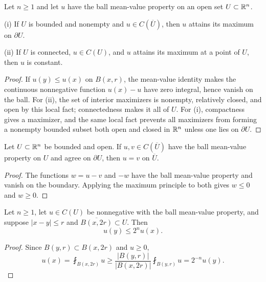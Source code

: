 \begin{theorem}
\label{thm:strong-maximum-principle-mvp}





Let $n\ge1$ and let $u$ have the ball mean-value property on an open set
$U\subset\mathbb{R}^n$.

(i) If $U$ is bounded and nonempty and $u\in C(\overline U)$, then $u$ attains
its maximum on $\partial U$.

(ii) If $U$ is connected, $u\in C(U)$, and $u$ attains its maximum at a point
of $U$, then $u$ is constant.
\end{theorem}
\begin{proof}

\sketch If $u(y)\le u(x)$ on $B(x,r)$, the mean-value identity makes the
continuous nonnegative function $u(x)-u$ have zero integral, hence vanish on
the ball. For (ii), the set of interior maximizers is nonempty, relatively
closed, and open by this local fact; connectedness makes it all of $U$. For
(i), compactness gives a maximizer, and the same local fact prevents all
maximizers from forming a nonempty bounded subset both open and closed in
$\mathbb{R}^n$ unless one lies on $\partial U$.
\end{proof}

\begin{theorem}
\label{thm:uniqueness-dirichlet-mvp}




Let $U\subset\mathbb{R}^n$ be bounded and open. If $u,v\in C(\overline U)$ have the
ball mean-value property on $U$ and agree on $\partial U$, then
$u=v$ on $\overline U$.
\end{theorem}
\begin{proof}

\sketch The functions $w=u-v$ and $-w$ have the ball mean-value property and
vanish on the boundary. Applying the maximum principle to both gives
$w\le0$ and $w\ge0$.
\end{proof}

\begin{theorem}
\label{thm:harnack-local-mvp}




Let $n\ge1$, let $u\in C(U)$ be nonnegative with the ball mean-value property,
and suppose $|x-y|\le r$ and $\overline{B(x,2r)}\subset U$. Then
$$u(y)\le2^n u(x).$$
\end{theorem}
\begin{proof}

\sketch Since $B(y,r)\subset B(x,2r)$ and $u\ge0$,
$$u(x)=\fint_{B(x,2r)}u
\ge\frac{|B(y,r)|}{|B(x,2r)|}\fint_{B(y,r)}u
=2^{-n}u(y).$$
\end{proof}

